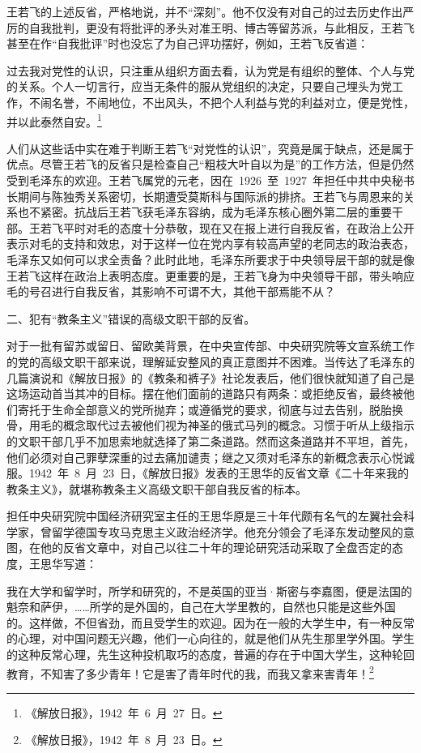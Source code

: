 王若飞的上述反省，严格地说，并不“深刻”。他不仅没有对自己的过去历史作出严厉的自我批判，更没有将批评的矛头对准王明、博古等留苏派，与此相反，王若飞甚至在作“自我批评”时也没忘了为自己评功摆好，例如，王若飞反省道：

\begin{quoting}
过去我对党性的认识，只注重从组织方面去看，认为党是有组织的整体、个人与党的关系。个人一切言行，应当无条件的服从党组织的决定，只要自己埋头为党工作，不闹名誉，不闹地位，不出风头，不把个人利益与党的利益对立，便是党性，并以此泰然自安。\footnote{《解放日报》，1942~年~6~月~27~日。}
\end{quoting}

人们从这些话中实在难于判断王若飞“对党性的认识”，究竟是属于缺点，还是属于优点。尽管王若飞的反省只是检查自己“粗枝大叶自以为是”的工作方法，但是仍然受到毛泽东的欢迎。王若飞属党的元老，因在~1926~至~1927~年担任中共中央秘书长期间与陈独秀关系密切，长期遭受莫斯科与国际派的排挤。王若飞与周恩来的关系也不紧密。抗战后王若飞获毛泽东容纳，成为毛泽东核心圈外第二层的重要干部。王若飞平时对毛的态度十分恭敬，现在又在报上进行自我反省，在政治上公开表示对毛的支持和效忠，对于这样一位在党内享有较高声望的老同志的政治表态，毛泽东又如何可以求全责备？此时此地，毛泽东所要求于中央领导层干部的就是像王若飞这样在政治上表明态度。更重要的是，王若飞身为中央领导干部，带头响应毛的号召进行自我反省，其影响不可谓不大，其他干部焉能不从？

二、犯有“教条主义”错误的高级文职干部的反省。

对于一批有留苏或留日、留欧美背景，在中央宣传部、中央研究院等文宣系统工作的党的高级文职干部来说，理解延安整风的真正意图并不困难。当传达了毛泽东的几篇演说和《解放日报》的《教条和裤子》社论发表后，他们很快就知道了自己是这场运动首当其冲的目标。摆在他们面前的道路只有两条：或拒绝反省，最终被他们寄托于生命全部意义的党所抛弃；或遵循党的要求，彻底与过去告别，脱胎换骨，用毛的概念取代过去被他们视为神圣的俄式马列的概念。习惯于听从上级指示的文职干部几乎不加思索地就选择了第二条道路。然而这条道路并不平坦，首先，他们必须对自己罪孽深重的过去痛加谴责；继之又须对毛泽东的新概念表示心悦诚服。1942~年~8~月~23~日，《解放日报》发表的王思华的反省文章《二十年来我的教条主义》，就堪称教条主义高级文职干部自我反省的标本。

担任中央研究院中国经济研究室主任的王思华原是三十年代颇有名气的左翼社会科学家，曾留学德国专攻马克思主义政治经济学。他充分领会了毛泽东发动整风的意图，在他的反省文章中，对自己以往二十年的理论研究活动采取了全盘否定的态度，王思华写道：

\begin{quoting}
我在大学和留学时，所学和研究的，不是英国的亚当·斯密与李嘉图，便是法国的魁奈和萨伊，……所学的是外国的，自己在大学里教的，自然也只能是这些外国的。这样做，不但省劲，而且受学生的欢迎。因为在一般的大学生中，有一种反常的心理，对中国问题无兴趣，他们一心向往的，就是他们从先生那里学外国。学生的这种反常心理，先生这种投机取巧的态度，普遍的存在于中国大学生，这种轮回教育，不知害了多少青年！它是害了青年时代的我，而我又拿来害青年！\footnote{《解放日报》，1942~年~8~月~23~日。}
\end{quoting}

